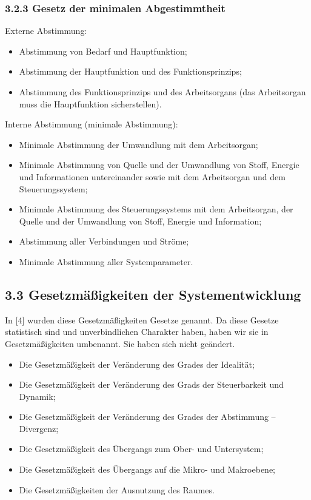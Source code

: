 \documentclass[11pt,a4paper]{article}
\begin{document}
\subsubsection{3.2.3 Gesetz der minimalen Abgestimmtheit}
Externe Abstimmung:
\begin{itemize}[noitemsep]
\item Abstimmung von Bedarf und Hauptfunktion;
\item Abstimmung der Hauptfunktion und des Funktionsprinzips;
\item Abstimmung des Funktionsprinzips und des Arbeitsorgans (das Arbeitsorgan
  muss die Hauptfunktion sicherstellen).
\end{itemize}
Interne Abstimmung (minimale Abstimmung):
\begin{itemize}[noitemsep]
\item Minimale Abstimmung der Umwandlung mit dem Arbeitsorgan;
\item Minimale Abstimmung von Quelle und der Umwandlung von Stoff, Energie und
  Informationen untereinander sowie mit dem Arbeitsorgan und dem
  Steuerungssystem;
\item Minimale Abstimmung des Steuerungssystems mit dem Arbeitsorgan, der
  Quelle und der Umwandlung von Stoff, Energie und Information;
 \item Abstimmung aller Verbindungen und Ströme;
 \item Minimale Abstimmung aller Systemparameter.
\end{itemize}

\subsection{3.3 Gesetzmäßigkeiten der Systementwicklung}

In [4] wurden diese Gesetzmäßigkeiten Gesetze genannt. Da diese Gesetze
statistisch sind und unverbindlichen Charakter haben, haben wir sie in
Gesetzmäßigkeiten umbenannt. Sie haben sich nicht geändert.
\begin{itemize}[noitemsep]
\item Die Gesetzmäßigkeit der Veränderung des Grades der Idealität;
\item Die Gesetzmäßigkeit der Veränderung des Grads der Steuerbarkeit und
  Dynamik;
\item Die Gesetzmäßigkeit der Veränderung des Grades der Abstimmung --
  Divergenz;
\item Die Gesetzmäßigkeit des Übergangs zum Ober- und Untersystem;
\item Die Gesetzmäßigkeit des Übergangs auf die Mikro- und Makroebene;
\item Die Gesetzmäßigkeiten der Ausnutzung des Raumes.
\end{itemize}
\end{document}

